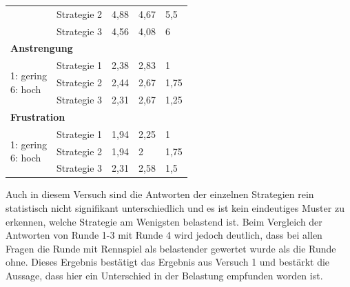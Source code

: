 \documentclass[12pt,a4paper]{scrartcl}
\begin{document}
\begin{longtable}{|p{4cm}|p{2cm}|p{2cm}|p{2cm}|p{2cm}|}
 & Strategie 2 & 4,88 & 4,67 & 5,5 \\
 & Strategie 3 & 4,56 & 4,08 & 6 \\
\hline
		\multicolumn{5}{l}{\textbf{Anstrengung}}\\
		\hline
\multirow{3}{4cm}{1: gering \newline 6: hoch} & Strategie 1 & 2,38 & 2,83 & 1 \\
 & Strategie 2 & 2,44 & 2,67 & 1,75 \\
 & Strategie 3 & 2,31 & 2,67 & 1,25\\
\hline
		\multicolumn{5}{l}{\textbf{Frustration}}\\
		\hline
\multirow{3}{4cm}{1: gering \newline 6: hoch} & Strategie 1 & 1,94 & 2,25 & 1 \\
 & Strategie 2 & 1,94 & 2 & 1,75 \\
 & Strategie 3 & 2,31 & 2,58 & 1,5 \\
\hline
\end{longtable}

Auch in diesem Versuch sind die Antworten der einzelnen Strategien rein statistisch nicht signifikant unterschiedlich und es ist kein eindeutiges Muster zu erkennen, welche Strategie am Wenigsten belastend ist. 
Beim Vergleich der Antworten von Runde 1-3 mit Runde 4 wird jedoch deutlich, dass bei allen Fragen die Runde mit Rennspiel als belastender gewertet wurde als die Runde ohne. Dieses Ergebnis bestätigt das Ergebnis aus Versuch 1 und bestärkt die Aussage, dass hier ein Unterschied in der Belastung empfunden worden ist.  
\end{document}
